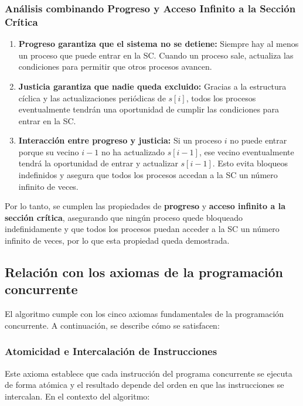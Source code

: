\documentclass[a4paper,12pt]{article}
\begin{document}
\subsubsection{Análisis combinando Progreso y Acceso Infinito a la Sección Crítica}

\begin{enumerate}
    \item \textbf{Progreso garantiza que el sistema no se detiene:}  
    Siempre hay al menos un proceso que puede entrar en la SC. Cuando un proceso sale, actualiza las condiciones para permitir que otros procesos avancen.

    \item \textbf{Justicia garantiza que nadie queda excluido:}  
    Gracias a la estructura cíclica y las actualizaciones periódicas de $s[i]$, todos los procesos eventualmente tendrán una oportunidad de cumplir las condiciones para entrar en la SC.

    \item \textbf{Interacción entre progreso y justicia:}  
    Si un proceso $i$ no puede entrar porque su vecino $i-1$ no ha actualizado $s[i-1]$, ese vecino eventualmente tendrá la oportunidad de entrar y actualizar $s[i-1]$. Esto evita bloqueos indefinidos y asegura que todos los procesos accedan a la SC un número infinito de veces.
\end{enumerate}

Por lo tanto, se cumplen las propiedades de \textbf{progreso} y \textbf{acceso infinito a la sección crítica}, asegurando que ningún proceso quede bloqueado indefinidamente y que todos los procesos puedan acceder a la SC un número infinito de veces, por lo que esta propiedad queda demostrada.

\subsection{Relación con los axiomas de la programación concurrente}

El algoritmo cumple con los cinco axiomas fundamentales de la programación concurrente. A continuación, se describe cómo se satisfacen:

\subsubsection{Atomicidad e Intercalación de Instrucciones}

Este axioma establece que cada instrucción del programa concurrente se ejecuta de forma atómica y el resultado depende del orden en que las instrucciones se intercalan. En el contexto del algoritmo:
\end{document}
